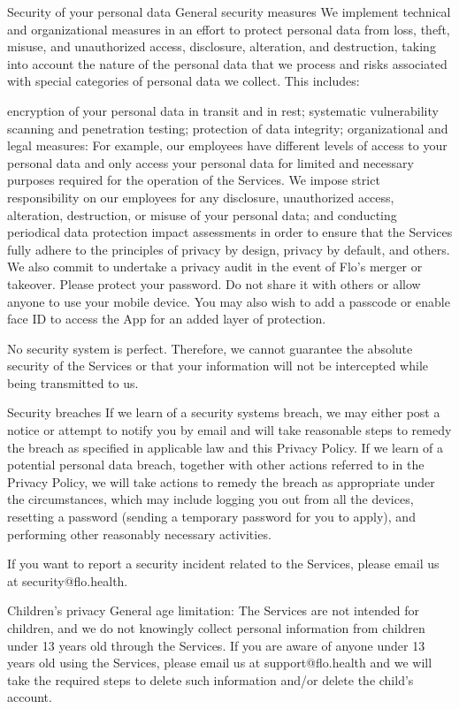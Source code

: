 Security of your personal data
General security measures
We implement technical and organizational measures in an effort to protect personal data from loss, theft, misuse, and unauthorized access, disclosure, alteration, and destruction, taking into account the nature of the personal data that we process and risks associated with special categories of personal data we collect. This includes:

encryption of your personal data in transit and in rest;
systematic vulnerability scanning and penetration testing;
protection of data integrity;
organizational and legal measures: For example, our employees have different levels of access to your personal data and only access your personal data for limited and necessary purposes required for the operation of the Services. We impose strict responsibility on our employees for any disclosure, unauthorized access, alteration, destruction, or misuse of your personal data; and
conducting periodical data protection impact assessments in order to ensure that the Services fully adhere to the principles of privacy by design, privacy by default, and others. We also commit to undertake a privacy audit in the event of Flo’s merger or takeover.
Please protect your password. Do not share it with others or allow anyone to use your mobile device. You may also wish to add a passcode or enable face ID to access the App for an added layer of protection. 

No security system is perfect. Therefore, we cannot guarantee the absolute security of the Services or that your information will not be intercepted while being transmitted to us.

Security breaches
If we learn of a security systems breach, we may either post a notice or attempt to notify you by email and will take reasonable steps to remedy the breach as specified in applicable law and this Privacy Policy. If we learn of a potential personal data breach, together with other actions referred to in the Privacy Policy, we will take actions to remedy the breach as appropriate under the circumstances, which may include logging you out from all the devices, resetting a password (sending a temporary password for you to apply), and performing other reasonably necessary activities.

If you want to report a security incident related to the Services, please email us at security@flo.health.

Children’s privacy
General age limitation: The Services are not intended for children, and we do not knowingly collect personal information from children under 13 years old through the Services. If you are aware of anyone under 13 years old using the Services, please email us at support@flo.health and we will take the required steps to delete such information and/or delete the child’s account. 

